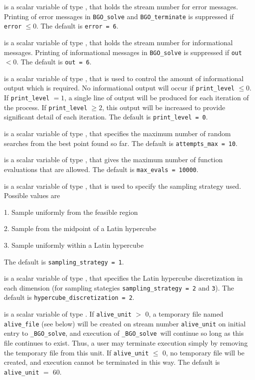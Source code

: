 \documentclass{galahad}
\newcommand{\packagename}{BGO}
\newcommand{\fullpackagename}{\libraryname\_\packagename}
\newcommand{\solver}{{\tt \fullpackagename\_solve}}
\begin{document}
\begin{description}

 is a scalar variable of type \integer, that holds the
stream number for error messages. Printing of error messages in
{\tt \packagename\_solve} and {\tt \packagename\_terminate}
is suppressed if {\tt error} $\leq 0$.
The default is {\tt error = 6}.

 is a scalar variable of type \integer, that holds the
stream number for informational messages. Printing of informational messages in
{\tt \packagename\_solve} is suppressed if {\tt out} $< 0$.
The default is {\tt out = 6}.

 is a scalar variable of type \integer, that is used
to control the amount of informational output which is required. No
informational output will occur if {\tt print\_level} $\leq 0$. If
{\tt print\_level} $= 1$, a single line of output will be produced for each
iteration of the process. If {\tt print\_level} $\geq 2$, this output will be
increased to provide significant detail of each iteration.
The default is {\tt print\_level = 0}.

 is a scalar variable of type \integer, that 
specifies the maximum number of random searches from the best point 
found so far.
The default is {\tt attempts\_max = 10}.

 is a scalar variable of type \integer, that gives
the maximum number of function evaluations that are allowed.
The default is {\tt max\_evals = 10000}.

 is a scalar variable of type \integer, 
that is used to specify the sampling strategy used. Possible values are
\begin{description}
\item 1. Sample uniformly from the feasible region
\item 2. Sample from the midpoint of a Latin hypercube
\item 3. Sample uniformly within a Latin hypercube
\end{description}
The default is {\tt sampling\_strategy = 1}.

 is a scalar variable of type \integer, 
that specifies the Latin hypercube discretization in each dimension
(for sampling stategies {\tt sampling\_strategy = 2} and {\tt 3}).
The default is {\tt hyper\-cube\_discretization = 2}.

 is a scalar variable of type \integer.
If {\tt alive\_unit} $>$ 0, a temporary file named {\tt alive\_file} (see below)
will be created on stream number {\tt alive\_unit} on initial entry to
\solver, and execution of \solver\ will continue so
long as this file continues to exist. Thus, a user may terminate execution
simply by removing the temporary file from this unit.
If {\tt alive\_unit} $\leq$ 0, no temporary file will be created, and
execution cannot be terminated in this way.
The default is {\tt alive\_unit} $=$ 60.


\end{description}
\end{document}
